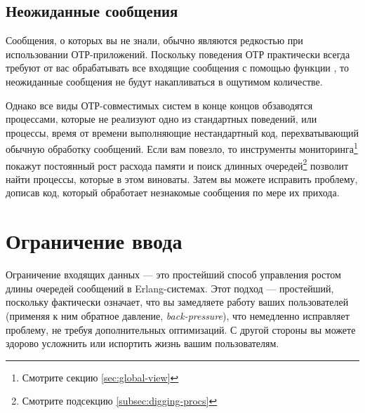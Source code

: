 \subsection{Неожиданные сообщения}

Сообщения, о которых вы не знали, обычно являются редкостью при использовании ОТР-приложений. Поскольку поведения ОТР практически всегда требуют от вас обрабатывать все входящие сообщения с помощью функции , то неожиданные сообщения не будут накапливаться в ощутимом количестве.

Однако все виды ОТР-совместимых систем в конце концов обзаводятся процессами, которые не реализуют одно из стандартных поведений, или процессы, время от времени выполняющие нестандартный код, перехватывающий обычную обработку сообщений. Если вам повезло, то инструменты мониторинга\footnote{Смотрите секцию \ref{sec:global-view}} покажут постоянный рост расхода памяти и поиск длинных очередей\footnote{Смотрите подсекцию \ref{subsec:digging-procs}} позволит найти процессы, которые в этом виноваты. Затем вы можете исправить проблему, дописав код, который обработает незнакомые сообщения по мере их прихода.


\section{Ограничение ввода}

Ограничение входящих данных --- это простейший способ управления ростом длины очередей сообщений в Erlang-системах. Этот подход --- простейший, поскольку фактически означает, что вы замедляете работу ваших пользователей (применяя к ним обратное давление, \emph{back-pressure}), что немедленно исправляет проблему, не требуя дополнительных оптимизаций. С другой стороны вы можете здорово усложнить или испортить жизнь вашим пользователям.

